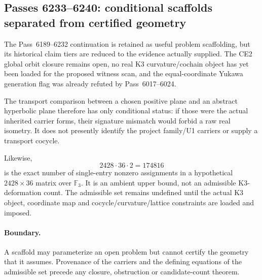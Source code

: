 \subsection*{Passes 6233--6240: conditional scaffolds separated from certified geometry}

The Pass~6189--6232 continuation is retained as useful problem scaffolding, but
its historical claim tiers are reduced to the evidence actually supplied.
The CE2 global orbit closure remains open, no real K3 curvature/cochain object
has yet been loaded for the proposed witness scan, and the equal-coordinate
Yukawa generation flag was already refuted by Pass~6017--6024.

The transport comparison between a chosen positive plane and an abstract
hyperbolic plane therefore has only conditional status: if those were the actual
inherited carrier forms, their signature mismatch would forbid a raw real
isometry.  It does not presently identify the project family/U1 carriers or
supply a transport cocycle.

Likewise,
\[
2428\cdot36\cdot2=174816
\]
is the exact number of single-entry nonzero assignments in a hypothetical
$2428\times36$ matrix over $\mathbb F_3$.  It is an ambient upper bound, not an
admissible K3-deformation count.  The admissible set remains undefined until the
actual K3 object, coordinate map and cocycle/curvature/lattice constraints are
loaded and imposed.

\paragraph{Boundary.}
A scaffold may parameterize an open problem but cannot certify the geometry that
it assumes.  Provenance of the carriers and the defining equations of the
admissible set precede any closure, obstruction or candidate-count theorem.
